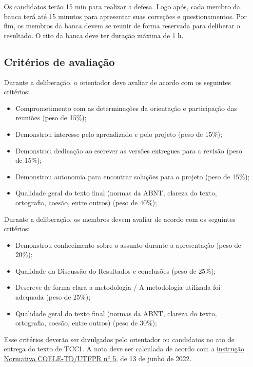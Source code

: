 \documentclass[a4paper, 12pt]{article}
\begin{document}
	Os candidatos terão 15 min para realizar a defesa. Logo após, cada membro da banca terá até 15 minutos para apresentar suas correções e questionamentos. Por fim, os membros da banca devem se reunir de forma reservada para deliberar o resultado. O rito da banca deve ter duração máxima de 1 h.
	
	

	\subsection{Critérios de avaliação}

	Durante a deliberação, o orientador deve avaliar de acordo com os seguintes critérios:

	\begin{itemize}
		\item Comprometimento com as determinações da orientação e participação das reuniões (peso de 15\%);
		\item Demonstrou interesse pelo aprendizado e pelo projeto (peso de 15\%);
		\item Demonstrou dedicação ao escrever as versões entregues para a revisão (peso de 15\%);
		\item Demonstrou autonomia para encontrar soluções para o projeto (peso de 15\%);
		\item Qualidade geral do texto final (normas da ABNT, clareza do texto, ortografia, coesão, entre outros) (peso de 40\%);
	\end{itemize}

	Durante a deliberação, os membros devem avaliar de acordo com os seguintes critérios:

	\begin{itemize}
		\item Demonstrou conhecimento sobre o assunto durante a apresentação (peso de 20\%);
		\item Qualidade da Discussão do Resultados e conclusões (peso de 25\%);
		\item Descreve de forma clara a metodologia / A metodologia utilizada foi adequada (peso de 25\%);
		\item Qualidade geral do texto final (normas da ABNT, clareza do texto, ortografia, coesão, entre outros) (peso de 30\%);
	\end{itemize}

	Esse critérios deverão ser divulgados pelo orientador ou candidatos no ato de entrega do texto de TCC1. A nota deve ser calculada de acordo com a \href{https://sei.utfpr.edu.br/sei/publicacoes/controlador_publicacoes.php?acao=publicacao_visualizar&id_documento=3053252&id_orgao_publicacao=0}{instrução Normativa COELE-TD/UTFPR nº 5}, de  13 de junho de 2022.
\end{document}
